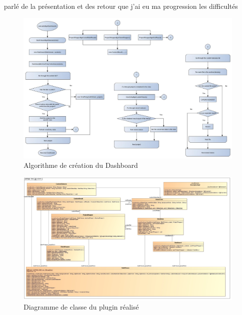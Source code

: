 parlé de la présentation et des retour que j'ai eu
ma progression
les difficultés



\begin{figure}[!h]
  \centering
      \includegraphics[width=\textheight,angle=90]{images/dashboardGenesis.jpg}
  \caption{Algorithme de création du Dashboard}
	\label{figure:dashboardGenesis}
\end{figure}


\begin{figure}[!h]
  \centering
      \includegraphics[width=\textheight,angle=90]{images/myDash.jpg}
  \caption{Diagramme de classe du plugin réalisé}
	\label{figure:myDash}
\end{figure}
